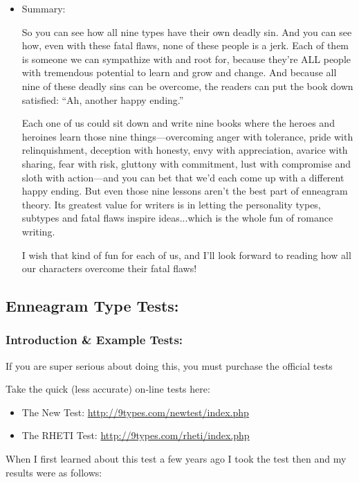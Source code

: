 \documentclass[openleft,oneside,showtrims]{memoir}
\begin{document}
\begin{itemize}
\item Summary:
\label{sec:org5ba368e}

So you can see how all nine types have their own deadly sin. And you can see how, even with these fatal flaws, none of these people is a jerk. Each of them is someone we can sympathize with and root for, because they're ALL people with tremendous potential to learn and grow and change. And because all nine of these deadly sins can be overcome, the readers can put the book down satisfied: ``Ah, another happy ending.''

Each one of us could sit down and write nine books where the heroes and heroines learn those nine things—overcoming anger with tolerance, pride with relinquishment, deception with honesty, envy with appreciation, avarice with sharing, fear with risk, gluttony with commitment, lust with compromise and sloth with action—and you can bet that we'd each come up with a different happy ending. But even those nine lessons aren't the best part of enneagram theory. Its greatest value for writers is in letting the personality types, subtypes and fatal flaws inspire ideas...which is the whole fun of romance writing.

I wish that kind of fun for each of us, and I'll look forward to reading how all our characters overcome their fatal flaws!
\end{itemize}

\subsection{Enneagram Type Tests:}
\label{sec:org579b1fe}
\subsubsection*{Introduction \& Example Tests:}
\label{sec:orgdb2df61}

If you are super serious about doing this, you must purchase the official tests

Take the quick (less accurate) on-line tests here:

\begin{itemize}
\item The New Test: \url{http://9types.com/newtest/index.php}
\item The RHETI Test: \url{http://9types.com/rheti/index.php}
\end{itemize}

When I first learned about this test a few years ago I took the test then and my results were as follows:
\end{document}
